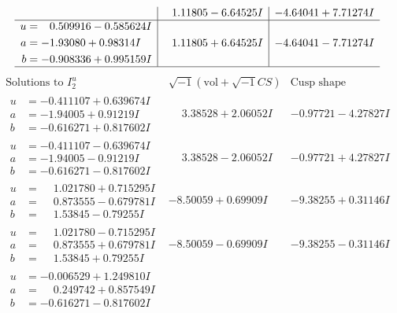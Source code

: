 \documentclass[1p]{elsarticle_modified}
\theoremstyle{definition}
\newcommand{\I}{\sqrt{-1}}
\begin{document}
$$\begin{array}{c|c|c}
 & \phantom{-}1.11805 - 6.64525 I & -4.64041 + 7.71274 I \\ \hline\begin{aligned}
u &= \phantom{-}0.509916 - 0.585624 I \\
a &= -1.93080 + 0.98314 I \\
b &= -0.908336 + 0.995159 I\end{aligned}
 & \phantom{-}1.11805 + 6.64525 I & -4.64041 - 7.71274 I\\
 \hline 
 \end{array}$$\newpage$$\begin{array}{c|c|c}  
\text{Solutions to }I^u_{2}& \I (\text{vol} + \sqrt{-1}CS) & \text{Cusp shape}\\
 \hline 
\begin{aligned}
u &= -0.411107 + 0.639674 I \\
a &= -1.94005 + 0.91219 I \\
b &= -0.616271 + 0.817602 I\end{aligned}
 & \phantom{-}3.38528 + 2.06052 I & -0.97721 - 4.27827 I \\ \hline\begin{aligned}
u &= -0.411107 - 0.639674 I \\
a &= -1.94005 - 0.91219 I \\
b &= -0.616271 - 0.817602 I\end{aligned}
 & \phantom{-}3.38528 - 2.06052 I & -0.97721 + 4.27827 I \\ \hline\begin{aligned}
u &= \phantom{-}1.021780 + 0.715295 I \\
a &= \phantom{-}0.873555 - 0.679781 I \\
b &= \phantom{-}1.53845 - 0.79255 I\end{aligned}
 & -8.50059 + 0.69909 I & -9.38255 + 0.31146 I \\ \hline\begin{aligned}
u &= \phantom{-}1.021780 - 0.715295 I \\
a &= \phantom{-}0.873555 + 0.679781 I \\
b &= \phantom{-}1.53845 + 0.79255 I\end{aligned}
 & -8.50059 - 0.69909 I & -9.38255 - 0.31146 I \\ \hline\begin{aligned}
u &= -0.006529 + 1.249810 I \\
a &= \phantom{-}0.249742 + 0.857549 I \\
b &= -0.616271 - 0.817602 I\end{aligned}

\end{array}$$
\end{document}
